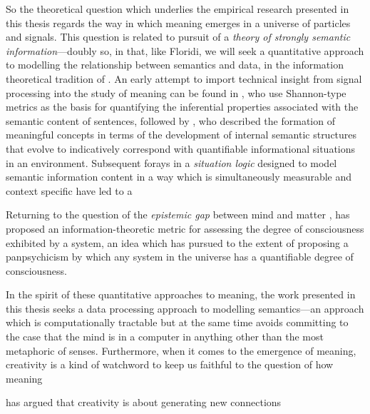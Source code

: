 

So the theoretical question which underlies the empirical research presented in this thesis regards the way in which meaning emerges in a universe of particles and signals.  This question is related to  pursuit of a \emph{theory of strongly semantic information}---doubly so, in that, like Floridi, we will seek a quantitative approach to modelling the relationship between semantics and data, in the information theoretical tradition of \cite{Shannon}.  An early attempt to import technical insight from signal processing into the study of meaning can be found in , who use Shannon-type metrics as the basis for quantifying the inferential properties associated with the semantic content of sentences, followed by \cite{Dretske}, who described the formation of meaningful concepts in terms of the development of internal semantic structures that evolve to indicatively correspond with quantifiable informational situations in an environment.  Subsequent forays in a \emph{situation logic} designed to model semantic information content in a way which is simultaneously measurable and context specific \citep{BarwiseEA} have led to a 

Returning to the question of the \emph{epistemic gap} between mind and matter \citep{Levine,Pattee}, \cite{Tonnoni} has proposed an information-theoretic metric for assessing the degree of consciousness exhibited by a system, an idea which \cite{Koch} has pursued to the extent of proposing a panpsychicism by which any system in the universe has a quantifiable degree of consciousness.

In the spirit of these quantitative approaches to meaning, the work presented in this thesis seeks a data processing approach to modelling semantics---an approach which is computationally tractable but at the same time avoids committing to the case that the mind is in a computer in anything other than the most metaphoric of senses.  Furthermore,  when it comes to the emergence of meaning, creativity is a kind of watchword to keep us faithful to the question of how meaning 

\cite{Koestler1964} has argued that creativity is about generating new connections 

